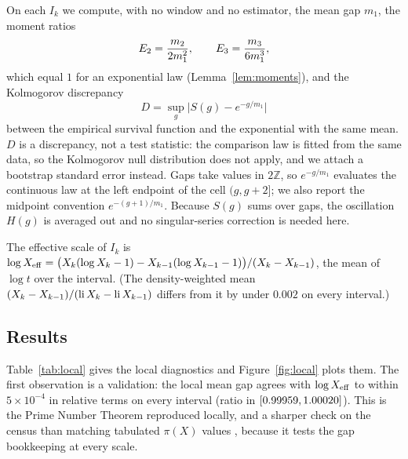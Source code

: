\documentclass[11pt,a4paper]{article}
\begin{document}
On each $I_k$ we compute, with no window and no estimator, the mean gap $m_1$, the moment ratios
\begin{equation}
E_2=\frac{m_2}{2m_1^2},\qquad E_3=\frac{m_3}{6m_1^3},
\end{equation}
which equal $1$ for an exponential law (Lemma~\ref{lem:moments}), and the Kolmogorov discrepancy
\begin{equation}
D=\sup_g\bigl|S(g)-e^{-g/m_1}\bigr|
\end{equation}
between the empirical survival function and the exponential with the same mean. $D$ is a discrepancy, not a test statistic: the comparison law is fitted from the same data, so the Kolmogorov null distribution does not apply, and we attach a bootstrap standard error instead. Gaps take values in $2\mathbb{Z}$, so $e^{-g/m_1}$ evaluates the continuous law at the left endpoint of the cell $(g,g+2]$; we also report the midpoint convention $e^{-(g+1)/m_1}$. Because $S(g)$ sums over gaps, the oscillation $H(g)$ is averaged out and no singular-series correction is needed here.

The effective scale of $I_k$ is $\log X_{\mathrm{eff}}=\bigl(X_k(\log X_k-1)-X_{k-1}(\log X_{k-1}-1)\bigr)/(X_k-X_{k-1})$, the mean of $\log t$ over the interval. (The density-weighted mean $(X_k-X_{k-1})/(\operatorname{li} X_k-\operatorname{li} X_{k-1})$ differs from it by under $0.002$ on every interval.)

\subsection{Results}

Table~\ref{tab:local} gives the local diagnostics and Figure~\ref{fig:local} plots them. The first observation is a validation: the local mean gap agrees with $\log X_{\mathrm{eff}}$ to within $5\times10^{-4}$ in relative terms on every interval (ratio in $[0.99959,1.00020]$). This is the Prime Number Theorem reproduced locally, and a sharper check on the census than matching tabulated $\pi(X)$ values \cite{DelegliseRivat1996}, because it tests the gap bookkeeping at every scale.

\begin{table}[tbp]
\centering
\caption{Window-free local diagnostics on the nineteen differenced intervals. $\Etwo$, $\Ethree$ equal $1$ and $D$ equals $0$ for an exponential law; $D$ uses the left-endpoint convention. The column $\log\Xeff/m_1$ is a local test of the Prime Number Theorem.}
\label{tab:local}
{\footnotesize}
\end{table}
\end{document}
